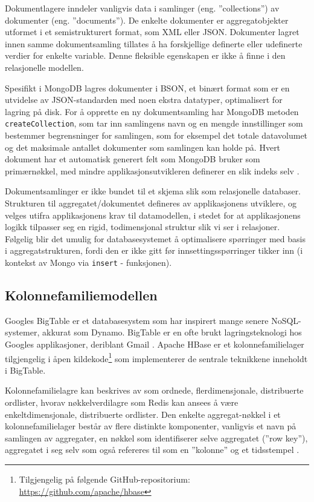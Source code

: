 Dokumentlagere inndeler vanligvis data i samlinger (eng. ''collections'') av dokumenter (eng. ''documents''). De enkelte dokumenter er aggregatobjekter utformet i et semistrukturert format, som XML eller JSON. Dokumenter lagret innen samme dokumentsamling tillates å ha forskjellige definerte eller udefinerte verdier for enkelte variable. Denne fleksible egenskapen er ikke å finne i den relasjonelle modellen.

Spesifikt i MongoDB lagres dokumenter i BSON, et binært format som er en utvidelse av JSON-standarden med noen ekstra datatyper, optimalisert for lagring på disk. For å opprette en ny dokumentsamling har MongoDB metoden \texttt{createCollection}, som tar inn samlingens navn og en mengde innstillinger som bestemmer begrensninger for samlingen, som for eksempel det totale datavolumet og det maksimale antallet dokumenter som samlingen kan holde på. Hvert dokument har et automatisk generert felt som MongoDB bruker som primærnøkkel, med mindre applikasjonsutvikleren definerer en slik indeks selv \citep{elmasri2014}.

Dokumentsamlinger er ikke bundet til et skjema slik som relasjonelle databaser. Strukturen til aggregatet/dokumentet defineres av applikasjonens utviklere, og velges utifra applikasjonens krav til datamodellen, i stedet for at applikasjonens logikk tilpasser seg en rigid, todimensjonal struktur slik vi ser i relasjoner. Følgelig blir det umulig for databasesystemet å optimalisere spørringer med basis i aggregatstrukturen, fordi den er ikke gitt før innsettingsspørringer tikker inn (i kontekst av Mongo via \texttt{insert} - funksjonen).

\subsection{Kolonnefamiliemodellen}

Googles BigTable er et databasesystem som har inspirert mange senere NoSQL-systemer, akkurat som Dynamo. BigTable er en ofte brukt lagringsteknologi hos Googles applikasjoner, deriblant Gmail \citep{elmasri2014}. Apache HBase er et kolonnefamilielager tilgjengelig i åpen kildekode\footnote{Tilgjengelig på følgende GitHub-repositorium: \url{https://github.com/apache/hbase}} som implementerer de sentrale teknikkene inneholdt i BigTable.

Kolonnefamilielagre kan beskrives av \cite{elmasri2014} som ordnede, flerdimensjonale, distribuerte ordlister, hvorav nøkkelverdilagre som Redis kan ansees å være enkeltdimensjonale, distribuerte ordlister. Den enkelte aggregat-nøkkel i et kolonnefamilielager består av flere distinkte komponenter, vanligvis et navn på samlingen av aggregater, en nøkkel som identifiserer selve aggregatet (''row key''), aggregatet i seg selv som også refereres til som en ''kolonne'' og et tidsstempel \citep{elmasri2014}.

